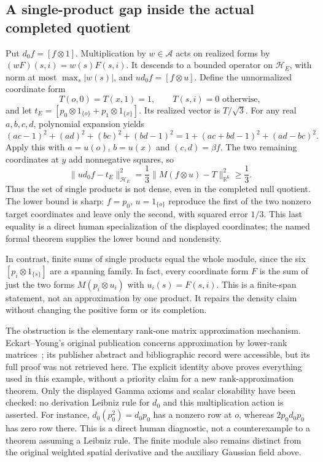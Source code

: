 \documentclass[11pt]{article}
\newcommand{\R}{\mathbb R}\newcommand{\C}{\mathbb C}
\begin{document}
\subsection*{A single-product gap inside the actual completed quotient}
Put $d_0f=[f\otimes1]$. Multiplication by $w\in\mathcal A$ acts on
realized forms by $(wF)(s,i)=w(s)F(s,i)$. It descends to a bounded
operator on $\mathcal H_E$, with norm at most $\max_s|w(s)|$,
and $u d_0f=[f\otimes u]$. Define the unnormalized coordinate form
\[
 T(o,0)=T(x,1)=1,\qquad T(s,i)=0\text{ otherwise},
\]
and let $t_E=[p_0\otimes1_{\{o\}}+p_1\otimes1_{\{x\}}]$.
Its realized vector is $T/\sqrt3$.
For any real $a,b,c,d$, polynomial expansion yields
\[
 (ac-1)^2+(ad)^2+(bc)^2+(bd-1)^2
 =1+(ac+bd-1)^2+(ad-bc)^2.
\]
Apply this with $a=u(o)$, $b=u(x)$ and $(c,d)=\beta f$.
The two remaining coordinates at $y$ add nonnegative squares, so
\[
 \|u d_0f-t_E\|_{\mathcal H_E}^2
 =\frac13\|M(f\otimes u)-T\|_{\R^6}^2\geq\frac13.
\]
Thus the set of single products is not dense, even in the completed
null quotient. The lower bound is sharp: $f=p_0$, $u=1_{\{o\}}$
reproduce the first of the two nonzero target coordinates and leave
only the second, with squared error $1/3$. This last equality is a
direct human specialization of the displayed coordinates; the named
formal theorem supplies the lower bound and nondensity.

In contrast, finite sums of single products equal the whole module,
since the six $[p_i\otimes1_{\{s\}}]$ are a spanning family. In fact,
every coordinate form $F$ is the sum of just the two forms
$M(p_i\otimes u_i)$ with $u_i(s)=F(s,i)$. This is a finite-span
statement, not an approximation by one product. It repairs the density
claim without changing the positive form or its completion.

The obstruction is the elementary rank-one matrix approximation
mechanism. Eckart--Young's original publication concerns approximation
by lower-rank matrices~\cite{EY}; its publisher abstract and bibliographic
record were accessible, but its full proof was not retrieved here.
The explicit identity above proves everything used in this example,
without a priority claim for a new rank-approximation theorem.
Only the displayed Gamma axioms and scalar closability have been
checked: no derivation Leibniz rule for $d_0$ and this multiplication
action is asserted. For instance, $d_0(p_0^2)=d_0p_0$ has a nonzero
row at $o$, whereas $2p_0d_0p_0$ has zero row there. This is a direct
human diagnostic, not a counterexample to a theorem assuming a
Leibniz rule. The finite module also remains distinct from the original
weighted spatial derivative and the auxiliary Gaussian field above.
\end{document}
